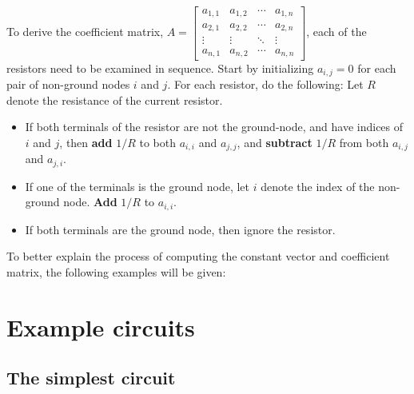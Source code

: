 \documentclass{article}
\begin{document}
To derive the coefficient matrix, \(A = \begin{bmatrix}
a_{1,1} & a_{1,2} & \cdots & a_{1,n} \\ 
a_{2,1} & a_{2,2} & \cdots & a_{2,n} \\ 
\vdots & \vdots & \ddots & \vdots \\
a_{n,1} & a_{n,2} & \cdots & a_{n,n} 
\end{bmatrix}\), each of the resistors need to be examined in sequence. Start by initializing \(a_{i,j} = 0\) for each pair of non-ground nodes \(i\) and \(j\). For each resistor, do the following: Let \(R\) denote the resistance of the current resistor.
\begin{itemize}
\item If both terminals of the resistor are not the ground-node, and have indices of \(i\) and \(j\), then {\bf add} \(1/R\) to both \(a_{i, i}\) and \(a_{j, j}\), and {\bf subtract} \(1/R\) from both \(a_{i,j}\) and \(a_{j,i}\). 
\item If one of the terminals is the ground node, let \(i\) denote the index of the non-ground node. {\bf Add} \(1/R\) to \(a_{i,i}\). 
\item If both terminals are the ground node, then ignore the resistor.
\end{itemize}

To better explain the process of computing the constant vector and coefficient matrix, the following examples will be given:


\section{Example circuits}

\subsection{The simplest circuit}
\end{document}
